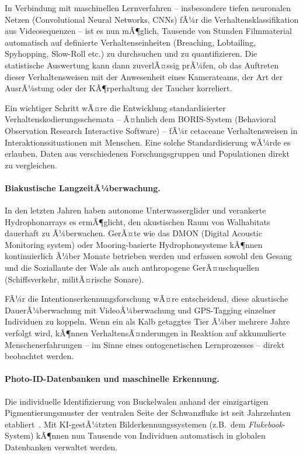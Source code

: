 ﻿\documentclass[12pt,a4paper]{article}
\theoremstyle{definition}
\theoremstyle{remark}
\begin{document}
In Verbindung mit maschinellen Lernverfahren -- insbesondere tiefen neuronalen Netzen (Convolutional Neural Networks, CNNs) fÃ¼r die Verhaltensklassifikation aus Videosequenzen -- ist es nun mÃ¶glich, Tausende von Stunden Filmmaterial automatisch auf definierte Verhaltenseinheiten (Breaching, Lobtailing, Spyhopping, Slow-Roll etc.) zu durchsuchen und zu quantifizieren. Die statistische Auswertung kann dann zuverlÃ¤ssig prÃ¼fen, ob das Auftreten dieser Verhaltensweisen mit der Anwesenheit eines Kamerateams, der Art der AusrÃ¼stung oder der KÃ¶rperhaltung der Taucher korreliert.

Ein wichtiger Schritt wÃ¤re die Entwicklung standardisierter Verhaltenskodierungsschemata -- Ã¤hnlich dem BORIS-System (Behavioral Observation Research Interactive Software) -- fÃ¼r cetaceane Verhaltensweisen in Interaktionssituationen mit Menschen. Eine solche Standardisierung wÃ¼rde es erlauben, Daten aus verschiedenen Forschungsgruppen und Populationen direkt zu vergleichen.

\paragraph{Biakustische LangzeitÃ¼berwachung.}
In den letzten Jahren haben autonome Unterwasserglider und verankerte Hydrophonarrays es ermÃ¶glicht, den akustischen Raum von Walhabitats dauerhaft zu Ã¼berwachen. GerÃ¤te wie das DMON (Digital Acoustic Monitoring system) oder Mooring-basierte Hydrophonsysteme kÃ¶nnen kontinuierlich Ã¼ber Monate betrieben werden und erfassen sowohl den Gesang und die Soziallaute der Wale als auch anthropogene GerÃ¤uschquellen (Schiffsverkehr, militÃ¤rische Sonare).

FÃ¼r die Intentionserkennungsforschung wÃ¤re entscheidend, diese akustische DauerÃ¼berwachung mit VideoÃ¼berwachung und GPS-Tagging einzelner Individuen zu koppeln. Wenn ein als Kalb getaggtes Tier Ã¼ber mehrere Jahre verfolgt wird, kÃ¶nnen VerhaltensÃ¤nderungen in Reaktion auf akkumulierte Menschenerfahrungen -- im Sinne eines ontogenetischen Lernprozesses -- direkt beobachtet werden.

\paragraph{Photo-ID-Datenbanken und maschinelle Erkennung.}
Die individuelle Identifizierung von Buckelwalen anhand der einzigartigen Pigmentierungsmuster der ventralen Seite der Schwanzfluke ist seit Jahrzehnten etabliert~\cite{payne1971songs}. Mit KI-gestÃ¼tzten Bilderkennungssystemen (z.B.\ dem \textit{Flukebook}-System) kÃ¶nnen nun Tausende von Individuen automatisch in globalen Datenbanken verwaltet werden.
\end{document}
